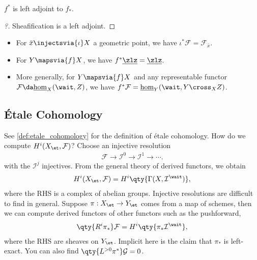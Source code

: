 \begin{theorem}[?]

\(f^*\) is left adjoint to \(f_*\).

\end{theorem}

\begin{proof}[?]

Sheafification is a left adjoint.

\end{proof}

\begin{example}[?]

\envlist

\begin{itemize}
\item
  For \(\bar x\injectsvia{\iota} X\) a geometric point, we have
  \(\iota^* \mathcal{F}= \mathcal{F}_{\bar x}\).
\item
  For \(Y\mapsvia{f} X\), we have
  \(f^* \underline{\zlz} = \underline{\zlz}\).
\item
  More generally, for \(Y\mapsvia{f} X\) and any representable functor
  \(\mathcal{F} \da \underline{\hom}_X(\wait, Z)\), we have
  \(f^* \mathcal{F} = \underline{\hom}_Y(\wait, Y\cross_X Z)\).
\end{itemize}

\end{example}

\hypertarget{uxe9tale-cohomology-1}{%
\subsection{Étale Cohomology}\label{uxe9tale-cohomology-1}}

See \cref{def:etale_cohomology} for the definition of étale cohomology.
How do we compute \(H^i(X_{\et}, \mathcal{F})\)? Choose an injective
resolution
\begin{align*}  
\mathcal{F}\to \mathcal{I}^0 \to \mathcal{I}^1 \to \cdots
.\end{align*} with the \(\mathcal{I}^j\) injectives. From the general
theory of derived functors, we obtain
\begin{align*}  
H^i(X_\et, \mathcal{F}) = H^i\qty{\Gamma(X, \mathcal{I}^\wait)}
,\end{align*} where the RHS is a complex of abelian groups. Injective
resolutions are difficult to find in general. Suppose
\(\pi:X_\et \to Y_\et\) comes from a map of schemes, then we can compute
derived functors of other functors such as the pushforward,
\begin{align*}  
\qty{R^i \pi_*} \mathcal{F} = H^i\qty{ \pi_* \mathcal{I}^\wait }
,\end{align*} where the RHS are sheaves on \(Y_\et\). Implicit here is
the claim that \(\pi_*\) is left-exact. You can also find
\(\qty{L^{>0} \pi^*} \mathcal{G} = 0\).

